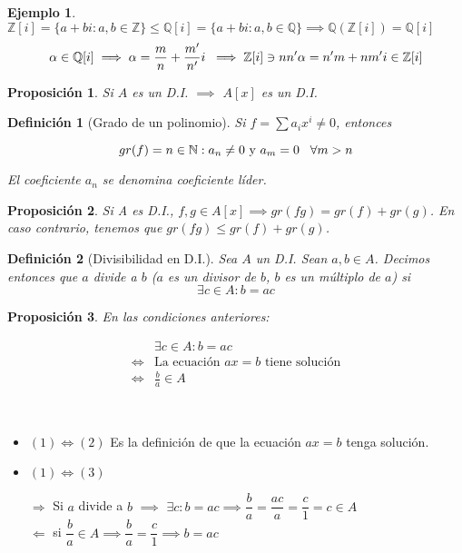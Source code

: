 \documentclass[11pt, a4paper, titlepage]{article}
\makeatletter
\renewenvironment{proof}[1][\proofname] {\vspace{-15pt}\par\pushQED{\qed}\normalfont\topsep6\p@\@plus6\p@\relax\trivlist\item[\hskip\labelsep\it#1\@addpunct{.}]\ignorespaces}{\popQED\endtrivlist\@endpefalse}
\providecommand{\ent}{\mathbb{Z}}
\providecommand{\rac}{\mathbb{Q}}
\theoremstyle{theorem-style}
\newtheorem*{nprop}{Proposición}
\theoremstyle{definition-style}
\newtheorem*{ndef}{Definición}
\theoremstyle{remark-style}
\theoremstyle{example-style}
\newtheorem*{ejemplo}{Ejemplo}
\makeatother
\begin{document}
\begin{ejemplo}
  $\ent[i] = \{a+bi : a,b\in \ent\} \le \rac[i] = \{a+bi : a,b\in \rac\} \implies \rac(\ent[i]) = \rac[i]$
  \[
    \alpha\in\rac[i]\implies\alpha=\frac{m}{n}+\frac{m'}{n'}i\; \implies \ent[i] \ni nn'\alpha = n'm+nm'i \in \ent[i]\notag
  \]
\end{ejemplo}

\begin{nprop}
	Si $A$ es un D.I. $\implies$ $A[x]$ es un D.I. 
\end{nprop}

\begin{ndef}[Grado de un polinomio]

  Si $f=\sum a_i x^i \neq 0$, entonces

  $$gr(f)=n\in \mathbb{N} : a_n\neq 0 \text{ y } a_m=0 \hspace{0.3cm} \forall m>n$$ 

El coeficiente $a_n$ se denomina coeficiente líder.
	
\end{ndef}

\begin{nprop}
	Si A es D.I., $f,g \in A[x]\implies gr(fg) = gr(f)+gr(g)$.
	En caso contrario, tenemos que $gr(fg) \le gr(f)+gr(g)$.
\end{nprop}

\begin{ndef}[Divisibilidad en D.I.]
	
Sea $A$ un D.I. Sean $a,b\in A$. Decimos entonces que $a$ divide a $b$ ($a$ es un divisor de $b$, $b$ es un múltiplo de $a$) si
\[
	\exists c \in A : b = ac 
\]
\end{ndef}

\begin{nprop}
  En las condiciones anteriores:
  
\begin{align}
	&\exists c \in A : b = ac 
\\
	\iff& \text{La ecuación } ax=b \text{ tiene solución}
\\
\iff& \frac{b}{a} \in A
\end{align}  
\end{nprop}

\begin{proof}\hfill\\
  \begin{itemize}
  \item $\boxed{(1) \iff (2)}$ Es la definición de que la ecuación $ax = b$ tenga solución.
  \item $\boxed{(1) \iff (3)}$
    
    $\boxed{\Longrightarrow}$ Si $a$ divide a $b$ $\implies$ $\exists c: b=ac \implies \dfrac{b}{a} = \dfrac{ac}{a} = \dfrac{c}{1} = c \in A$\\
    $\boxed{\Longleftarrow}$ si $\dfrac{b}{a}\in A \implies \dfrac{b}{a} = \dfrac{c}{1} \implies b = ac$
  \end{itemize}

\end{proof}
\end{document}
